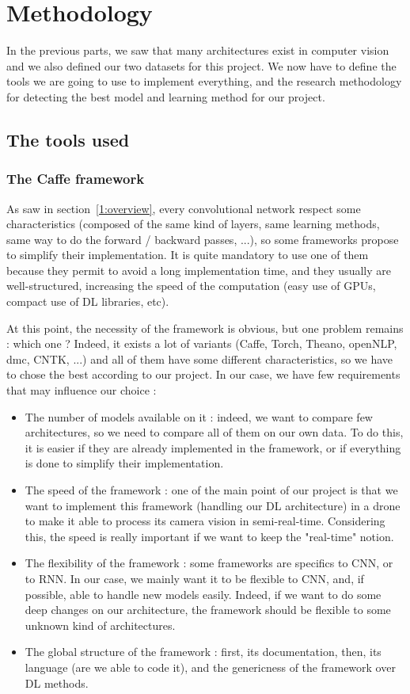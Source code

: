 \chapter{Methodology}


In the previous parts, we saw that many architectures exist in computer vision and we also defined our two datasets for this project. We now have to define the tools we are going to use to implement everything, and the research methodology for detecting the best model and learning method for our project.


\section{The tools used}
\subsection{The Caffe framework}
As saw in section~\ref{1:overview}, every convolutional network respect some characteristics (composed of the same kind of layers, same learning methods, same way to do the forward / backward passes, ...), so some frameworks propose to simplify their implementation. It is quite mandatory to use one of them because they permit to avoid a long implementation time, and they usually are well-structured, increasing the speed of the computation (easy use of GPUs, compact use of DL libraries, etc).

At this point, the necessity of the framework is obvious, but one problem remains : which one ? Indeed, it exists a lot of variants (Caffe, Torch, Theano, openNLP, dmc, CNTK, ...) and all of them have some different characteristics, so we have to chose the best according to our project. In our case, we have few requirements that may influence our choice :
\begin{itemize}
\item The number of models available on it : indeed, we want to compare few architectures, so we need to compare all of them on our own data. To do this, it is easier if they are already implemented in the framework, or if everything is done to simplify their implementation.
\item The speed of the framework : one of the main point of our project is that we want to implement this framework (handling our DL architecture) in a drone to make it able to process its camera vision in semi-real-time. Considering this, the speed is really important if we want to keep the "real-time" notion.
\item The flexibility of the framework : some frameworks are specifics to CNN, or to RNN. In our case, we mainly want it to be flexible to CNN, and, if possible, able to handle new models easily. Indeed, if we want to do some deep changes on our architecture, the framework should be flexible to some unknown kind of architectures.
\item The global structure of the framework : first, its documentation, then, its language (are we able to code it), and the genericness of the framework over DL methods.
\end{itemize}


